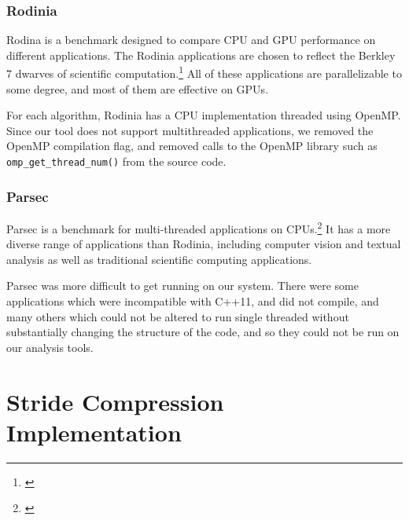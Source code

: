 \documentclass[12pt,twoside]{reedthesis}
\begin{document}
		\subsubsection{Rodinia}
		
		Rodina is a benchmark designed to compare CPU and GPU performance on different applications. The Rodinia applications are chosen to reflect the Berkley 7 dwarves of scientific computation.\footnote{\cite{Che:2009}} All of these applications are parallelizable to some degree, and most of them are effective on GPUs. 
		
		
		For each algorithm, Rodinia has a CPU implementation threaded using OpenMP. Since our tool does not support multithreaded applications, we removed the OpenMP compilation flag, and removed calls to the OpenMP library such as \texttt{omp\_get\_thread\_num()} from the source code. 
		
		\subsubsection{Parsec}
		
		Parsec is a benchmark for multi-threaded applications on CPUs.\footnote{\cite{Bienia:2008}} It has a more diverse range of applications than Rodinia, including computer vision and textual analysis as well as traditional scientific computing applications.
		
		Parsec was more difficult to get running on our system. There were some applications which were incompatible with C++11, and did not compile, and many others which could not be altered to run single threaded without substantially changing the structure of the code, and so they could not be run on our analysis tools.  
		

	
	\section{Stride Compression Implementation}
	
\end{document}
